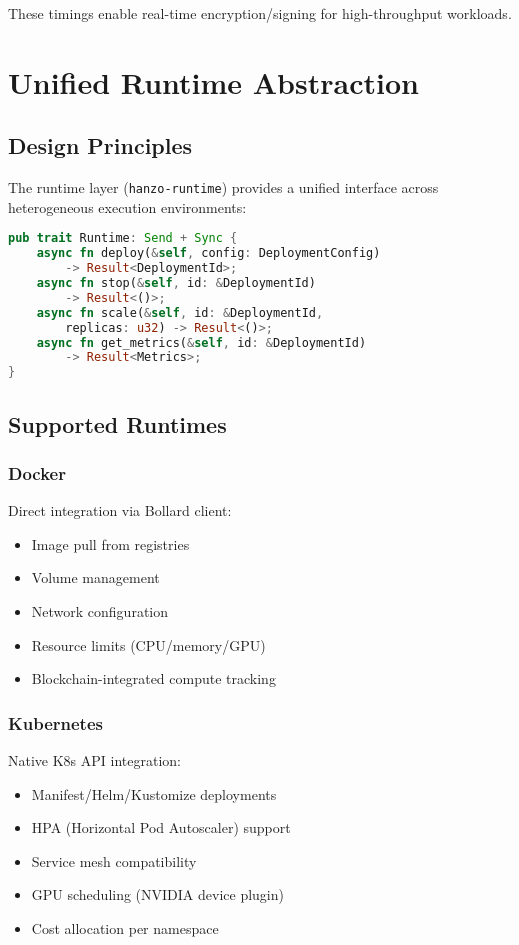 \documentclass[11pt,twocolumn]{article}
\begin{document}
These timings enable real-time encryption/signing for high-throughput workloads.

\section{Unified Runtime Abstraction}

\subsection{Design Principles}

The runtime layer (\texttt{hanzo-runtime}) provides a unified interface across heterogeneous execution environments:

\begin{lstlisting}[language=Rust, basicstyle=\small\ttfamily]
pub trait Runtime: Send + Sync {
    async fn deploy(&self, config: DeploymentConfig)
        -> Result<DeploymentId>;
    async fn stop(&self, id: &DeploymentId)
        -> Result<()>;
    async fn scale(&self, id: &DeploymentId,
        replicas: u32) -> Result<()>;
    async fn get_metrics(&self, id: &DeploymentId)
        -> Result<Metrics>;
}
\end{lstlisting}

\subsection{Supported Runtimes}

\subsubsection{Docker}

Direct integration via Bollard client:
\begin{itemize}
\item Image pull from registries
\item Volume management
\item Network configuration
\item Resource limits (CPU/memory/GPU)
\item Blockchain-integrated compute tracking
\end{itemize}

\subsubsection{Kubernetes}

Native K8s API integration:
\begin{itemize}
\item Manifest/Helm/Kustomize deployments
\item HPA (Horizontal Pod Autoscaler) support
\item Service mesh compatibility
\item GPU scheduling (NVIDIA device plugin)
\item Cost allocation per namespace
\end{itemize}
\end{document}
